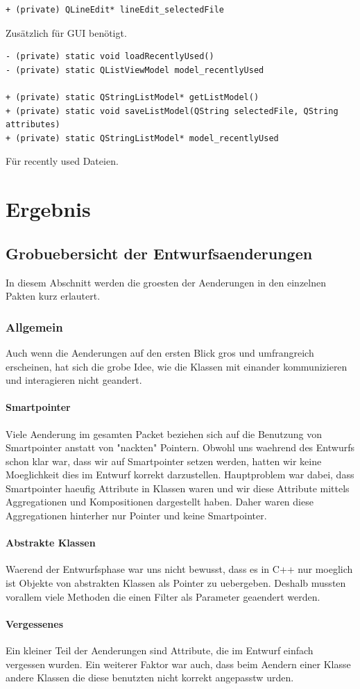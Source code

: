 \documentclass{scrartcl}
\begin{document}
{\begin{verbatim}
+ (private) QLineEdit* lineEdit_selectedFile
\end{verbatim}
Zusätzlich für GUI benötigt.
\bigskip
\begin{verbatim}
- (private) static void loadRecentlyUsed()
- (private) static QListViewModel model_recentlyUsed

+ (private) static QStringListModel* getListModel()
+ (private) static void saveListModel(QString selectedFile, QString attributes)
+ (private) static QStringListModel* model_recentlyUsed
\end{verbatim}
Für recently used Dateien.
\newpage
\section{Ergebnis}
\subsection{Grobuebersicht der Entwurfsaenderungen}
In diesem Abschnitt werden die groesten der Aenderungen in den einzelnen Pakten kurz erlautert.
\subsubsection{Allgemein}
Auch wenn die Aenderungen auf den ersten Blick gros und umfrangreich erscheinen, hat sich die grobe Idee, wie die Klassen mit einander kommunizieren und interagieren nicht geandert.
\paragraph{Smartpointer} Viele Aenderung im gesamten Packet beziehen sich auf die Benutzung von Smartpointer anstatt von "nackten" Pointern. Obwohl uns waehrend des Entwurfs schon klar war, dass wir auf Smartpointer setzen werden, hatten wir keine Moeglichkeit dies im Entwurf korrekt darzustellen. Hauptproblem war dabei, dass Smartpointer haeufig Attribute in Klassen waren und wir diese Attribute mittels Aggregationen und Kompositionen dargestellt haben. Daher waren diese Aggregationen hinterher nur Pointer und keine Smartpointer.
\paragraph{Abstrakte Klassen} Waerend der Entwurfsphase war uns nicht bewusst, dass es in C++ nur moeglich ist Objekte von abstrakten Klassen als Pointer zu uebergeben. Deshalb mussten vorallem viele Methoden die einen Filter als Parameter geaendert werden.
\paragraph{Vergessenes} Ein kleiner Teil der Aenderungen sind Attribute, die im Entwurf einfach vergessen wurden. Ein weiterer Faktor war auch, dass beim Aendern einer Klasse andere Klassen die diese benutzten nicht korrekt angepasstw urden.
}
\end{document}
